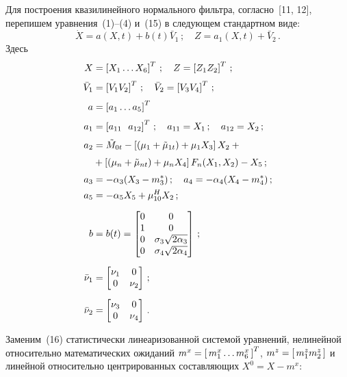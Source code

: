 \begin{multicols}{2}
Для построения квазилинейного нормального фильтра, согласно~[11, 12],
перепишем уравнения~(1)--(4) и~(15) в следующем стандартном виде:
\begin{equation}
\dot X = a (X,t) + b(t) \bar V_1\,;\quad Z= a_1 (X, t) +\bar V_2\,.
\end{equation}
Здесь
\begin{align}
X&=\left [ X_1 \ldots X_6\right ]^T\,; \quad Z= \left [ Z_1 Z_2\right ]^T\,;\notag\\[3pt]
\bar V_1& = \left [ V_1 V_2\right ]^T\,;\quad \bar V_2 =\left [ V_3 V_4\right ]^T\,;\notag\\[3pt]
a &= \left [ a_1\ldots a_5\right ]^T\,\;\notag\\[3pt]
a_1 &=\left [ a_{11}\ \ a_{12}\right ]^T\,;\quad a_{11}= X_1\,;\quad 
a_{12} = X_2\,;\notag\\[3pt]
a_2 &= \tilde M_{0t} -\left [ (\mu_1+\tilde\mu_{1t}) +
\mu_1 X_3\right ] X_2  +{}\notag\\[3pt]
&{}+\left [(\mu_n +\tilde \mu_{nt}) +\mu_n X_4\right ] F_n(X_1,
        X_2)- X_5\,;\notag\\[3pt]
a_3 &= -\alpha_3 (X_3 - m_3^*)\,;\quad a_4 =-\alpha_4(X_4 - m_4^*)\,;\\
a_5 &=-\alpha_5 X_5 +\mu_{10}^H X_2\,;   \\[6pt]
b&=b(t) =
\begin{bmatrix}
    0&0\\
    1&0\\
    0&\sigma_3\sqrt{2\alpha_3}\\
    0&\sigma_4 \sqrt{2\alpha_4}
\end{bmatrix}\,;\notag\\[6pt]
\bar\nu_1 &=
\begin{bmatrix}
    \nu_1&0\\
    0&\nu_2
\end{bmatrix}\,;\notag\\[6pt]
\bar\nu_2&=
\begin{bmatrix}
    \nu_3&0\\
    0&\nu_4
\end{bmatrix}\,.\notag
\end{align}

Заменим~(16) статистически линеаризованной системой уравнений,
нелинейной относительно математических ожиданий  $m^x =\left[\, m_1^x
\ldots m_6^x\,\right]^T$, $m^z=\left[\, m_1^z m_2^z\,\right]$ и линейной относительно
центрированных составляющих  $X^0 = X-m^x$:
    

\end{multicols}
